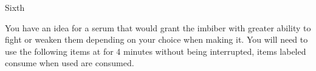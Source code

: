 \documentclass[greennotebook]{guildcamp4} %
\begin{document}
\begin{page}{Sixth}
	
	You have an idea for a serum that would grant the imbiber with greater ability to fight or weaken them depending on your choice when making it.
	You will need to use the following items at for 4 minutes without being interrupted, items labeled consume when used are consumed.
	
\end{page}


\endnotebook
\end{document}
